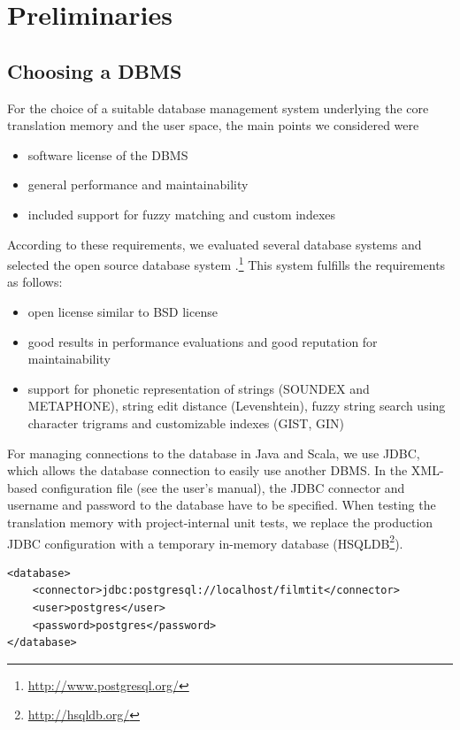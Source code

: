 \section{Preliminaries}

\subsection{Choosing a DBMS}
\label{sec:dbms}

For the choice of a suitable database management system underlying the
core translation memory and the user space, the main points we
considered were

\begin{itemize}
\item
  software license of the DBMS
\item
  general performance and maintainability
\item
  included support for fuzzy matching and custom indexes
\end{itemize}
According to these requirements, we evaluated several database systems
and selected the open source database system
\postgres.\footnote{\url{http://www.postgresql.org/}} This system
fulfills the requirements as follows:

\begin{itemize}
\item
  open license similar to BSD license
\item
  good results in performance evaluations and good reputation for
  maintainability
\item
  support for phonetic representation of strings (SOUNDEX and
  METAPHONE), string edit distance (Levenshtein), fuzzy string search
  using character trigrams and customizable indexes (GIST, GIN)
\end{itemize}

For managing connections to the database in Java and Scala, we use JDBC, 
which allows the database connection to easily use another DBMS. 
In the XML-based configuration file (see the user's manual), the JDBC connector
and username and password to the database have to be specified. When testing the
translation memory with project-internal unit tests, we replace the production JDBC
configuration with a temporary in-memory database (HSQLDB\footnote{\url{http://hsqldb.org/}}).

\begin{lstlisting}
<database>
    <connector>jdbc:postgresql://localhost/filmtit</connector>
    <user>postgres</user>
    <password>postgres</password>
</database>
\end{lstlisting}

